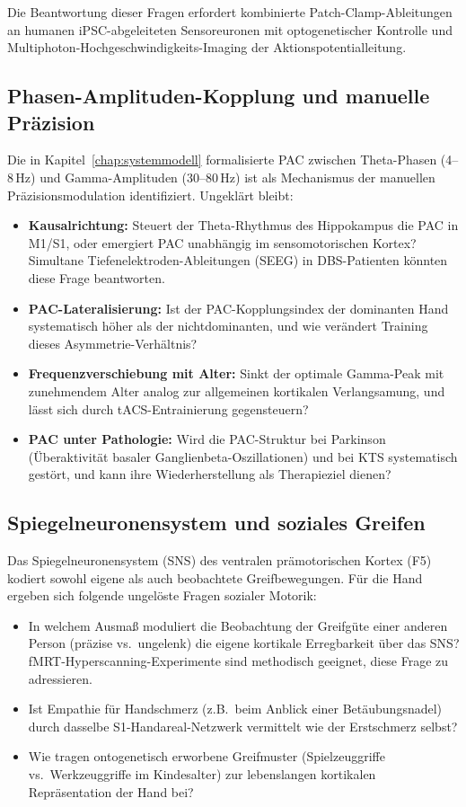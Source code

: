 ﻿\documentclass[12pt,a4paper]{report}
\theoremstyle{plain}
\theoremstyle{definition}
\theoremstyle{remark}
\begin{document}
Die Beantwortung dieser Fragen erfordert kombinierte Patch-Clamp-Ableitungen
an humanen iPSC-abgeleiteten Sensoreuronen mit optogenetischer Kontrolle
und Multiphoton-Hochgeschwindigkeits-Imaging der Aktionspotentialleitung.

\subsection{Phasen-Amplituden-Kopplung und manuelle Präzision}

Die in Kapitel~\ref{chap:systemmodell} formalisierte PAC zwischen
Theta-Phasen (4--8\,Hz) und Gamma-Amplituden (30--80\,Hz) ist als
Mechanismus der manuellen Präzisionsmodulation identifiziert. Ungeklärt
bleibt:

\begin{itemize}
\item \textbf{Kausalrichtung:} Steuert der Theta-Rhythmus des Hippokampus
  die PAC in M1/S1, oder emergiert PAC unabhängig im sensomotorischen Kortex?
  Simultane Tiefenelektroden-Ableitungen (SEEG) in DBS-Patienten könnten
  diese Frage beantworten.
\item \textbf{PAC-Lateralisierung:} Ist der PAC-Kopplungsindex der dominanten
  Hand systematisch höher als der nichtdominanten, und wie verändert
  Training dieses Asymmetrie-Verhältnis?
\item \textbf{Frequenzverschiebung mit Alter:} Sinkt der optimale Gamma-Peak
  mit zunehmendem Alter analog zur allgemeinen kortikalen Verlangsamung,
  und lässt sich durch tACS-Entrainierung gegensteuern?
\item \textbf{PAC unter Pathologie:} Wird die PAC-Struktur bei Parkinson
  (Überaktivität basaler Ganglienbeta-Oszillationen) und bei KTS
  systematisch gestört, und kann ihre Wiederherstellung als
  Therapieziel dienen?
\end{itemize}

\subsection{Spiegelneuronensystem und soziales Greifen}

Das Spiegelneuronensystem (SNS) des ventralen prämotorischen Kortex (F5)
kodiert sowohl eigene als auch beobachtete Greifbewegungen. Für die Hand
ergeben sich folgende ungelöste Fragen sozialer Motorik:

\begin{itemize}
\item In welchem Ausmaß moduliert die Beobachtung der Greifgüte einer
  anderen Person (präzise vs.\ ungelenk) die eigene kortikale Erregbarkeit
  über das SNS? fMRT-Hyperscanning-Experimente sind methodisch geeignet,
  diese Frage zu adressieren.
\item Ist Empathie für Handschmerz (z.B.\ beim Anblick einer
  Betäubungsnadel) durch dasselbe S1-Handareal-Netzwerk vermittelt
  wie der Erstschmerz selbst?
\item Wie tragen ontogenetisch erworbene Greifmuster (Spielzeuggriffe vs.\
  Werkzeuggriffe im Kindesalter) zur lebenslangen kortikalen
  Repräsentation der Hand bei?
\end{itemize}
\end{document}
